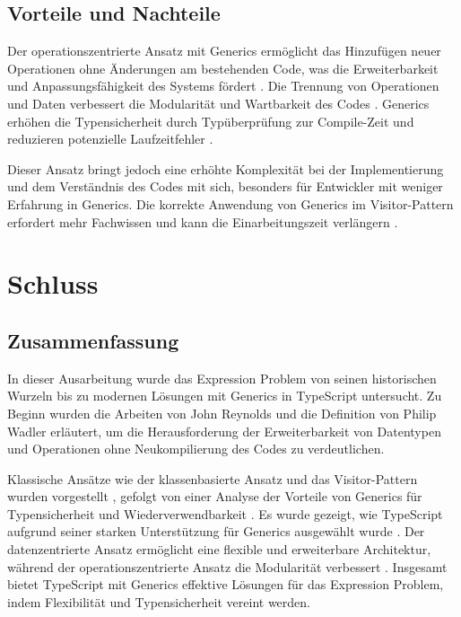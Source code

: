 \documentclass{easychair}
\begin{document}
\subsection{Vorteile und Nachteile}

Der operationszentrierte Ansatz mit Generics ermöglicht das Hinzufügen neuer Operationen ohne Änderungen am bestehenden Code, was die Erweiterbarkeit und Anpassungsfähigkeit des Systems fördert \cite{rozentals2019typescript}. Die Trennung von Operationen und Daten verbessert die Modularität und Wartbarkeit des Codes \cite{hughes1989functional}. Generics erhöhen die Typensicherheit durch Typüberprüfung zur Compile-Zeit und reduzieren potenzielle Laufzeitfehler \cite{typescript2019deepdive}.

Dieser Ansatz bringt jedoch eine erhöhte Komplexität bei der Implementierung und dem Verständnis des Codes mit sich, besonders für Entwickler mit weniger Erfahrung in Generics. Die korrekte Anwendung von Generics im Visitor-Pattern erfordert mehr Fachwissen und kann die Einarbeitungszeit verlängern \cite{Krishnamurthi1998}.


\section{Schluss}
  \subsection{Zusammenfassung}

  In dieser Ausarbeitung wurde das Expression Problem von seinen historischen Wurzeln bis zu modernen Lösungen mit Generics in TypeScript untersucht. Zu Beginn wurden die Arbeiten von John Reynolds \cite{Reynolds1978} und die Definition von Philip Wadler \cite{wadler1998expression} erläutert, um die Herausforderung der Erweiterbarkeit von Datentypen und Operationen ohne Neukompilierung des Codes zu verdeutlichen.
  
  Klassische Ansätze wie der klassenbasierte Ansatz und das Visitor-Pattern wurden vorgestellt \cite{gamma1994design}, gefolgt von einer Analyse der Vorteile von Generics für Typensicherheit und Wiederverwendbarkeit \cite{rozentals2019typescript}. Es wurde gezeigt, wie TypeScript aufgrund seiner starken Unterstützung für Generics ausgewählt wurde \cite{typescript2019deepdive}. Der datenzentrierte Ansatz ermöglicht eine flexible und erweiterbare Architektur, während der operationszentrierte Ansatz die Modularität verbessert \cite{torgersen2004expression}. Insgesamt bietet TypeScript mit Generics effektive Lösungen für das Expression Problem, indem Flexibilität und Typensicherheit vereint werden.
\end{document}
